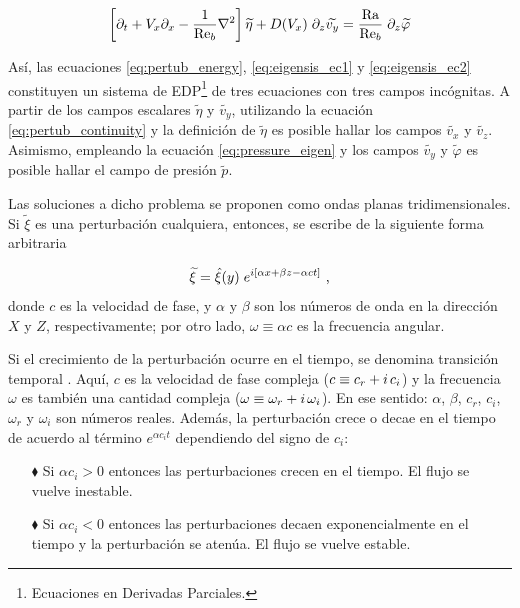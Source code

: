 \begin{equation}
 \left[ \partial_t + V_x \partial_x - \frac{1}{\text{Re}_b} \nabla^2  \right] \widetilde{\eta}  +  D(V_x) \hspace{1mm} \partial_z \widetilde{v_y} = \frac{\text{Ra}}{\text{Re}_b} \hspace{1mm} \partial_{z} \widetilde{\varphi}
\label{eq:eigensis_ec2}
\end{equation}

Así, las ecuaciones \ref{eq:pertub_energy}, \ref{eq:eigensis_ec1} y \ref{eq:eigensis_ec2} constituyen un sistema de EDP\footnote{Ecuaciones en Derivadas Parciales.} de tres ecuaciones con tres campos incógnitas. A partir de los campos escalares $\widetilde{\eta}$ y $\widetilde{v_y}$, utilizando la ecuación \ref{eq:pertub_continuity} y la definición de $\widetilde{\eta}$ es posible hallar los campos $\widetilde{v_x}$ y $\widetilde{v_z}$. Asimismo, empleando la ecuación \ref{eq:pressure_eigen} y los campos $\widetilde{v_y}$ y  $\widetilde{\varphi}$ es posible hallar el campo de presión  $\widetilde{p}$. 

Las soluciones a dicho problema se proponen como ondas planas tridimensionales. Si $\widetilde{\xi}$ es una perturbación cualquiera, entonces, se escribe de la siguiente forma arbitraria

\begin{equation}
\widetilde{\xi} = \hat{\xi}(y) \hspace{1mm} e^{i \left[ \alpha x + \beta z - \alpha c t \right]} \text{ ,}
\label{eq:waves3d}
\end{equation}
donde $c$  es la velocidad de fase, y $\alpha$ y $\beta$ son los números de onda en la dirección $X$ y $Z$, respectivamente; por otro lado, $\omega \equiv \alpha c$ es la frecuencia angular. 

Si el crecimiento de la perturbación ocurre en el tiempo, se denomina transición temporal \cite{machaca2024}. Aquí, $c$ es la velocidad de fase compleja ($c \equiv c_r + i \hspace{0.5mm} c_i$) y la frecuencia $\omega$ es también una cantidad compleja ($\omega \equiv \omega_r + i \hspace{0.5mm} \omega_i$). En ese sentido: $\alpha$, $\beta$, $c_r$, $c_i$, $\omega_r$ y $\omega_i$ son números reales. Además, la perturbación crece o decae en el tiempo de acuerdo al término $e^{\alpha c_i t}$ dependiendo del signo de $c_i$: 

\begin{itemize}
\item[$\blacklozenge$] Si $\alpha c_i > 0$ entonces las perturbaciones crecen en el tiempo. El flujo se vuelve inestable.

\item[$\blacklozenge$] Si $\alpha c_i < 0$ entonces las perturbaciones decaen exponencialmente en el tiempo y la perturbación se atenúa. El flujo se vuelve estable.
\end{itemize}

